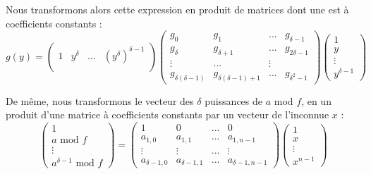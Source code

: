 \documentclass[a4paper]{article}
\begin{document}
Nous transformons alors cette expression en produit de matrices dont une est à coefficients constants :
\[
g(y) = 
\begin{pmatrix}
    1 & y^\delta & ... & (y^\delta)^{\delta-1}  \\  
\end{pmatrix}
\begin{pmatrix}
    g_0 & g_1 & ... & g_{\delta-1} \\
    g_{\delta} & g_{\delta+1} & ... & g_{2\delta-1} \\
    \vdots & ... & \vdots \\
    g_{\delta(\delta-1)} & g_{\delta(\delta-1)+1} & ... & g_{\delta^2-1}
\end{pmatrix}
\begin{pmatrix}
    1 \\
    y \\
    \vdots \\
    y^{\delta-1}
\end{pmatrix}
\]

De même, nous transformons le vecteur des $\delta$ puissances de $a$ mod $f$, en un produit d'une matrice à coefficients constants par un vecteur de l'inconnue $x$ :
\[
    \begin{pmatrix}
        1 \\
        a \text{ mod }f\\
        \vdots \\
        a^{\delta-1} \text{ mod }f
    \end{pmatrix}
    =
    \begin{pmatrix}
        1 & 0 & ... & 0 \\
        a_{1,0} & a_{1,1} & ... & a_{1,n-1} \\
        \vdots & \vdots & ... & \vdots \\
        a_{\delta-1,0} & a_{\delta-1,1} & ... & a_{\delta-1,n-1}
    \end{pmatrix}
    \begin{pmatrix}
        1 \\
        x \\
        \vdots \\
        x^{n-1}
    \end{pmatrix}
\]
\end{document}
